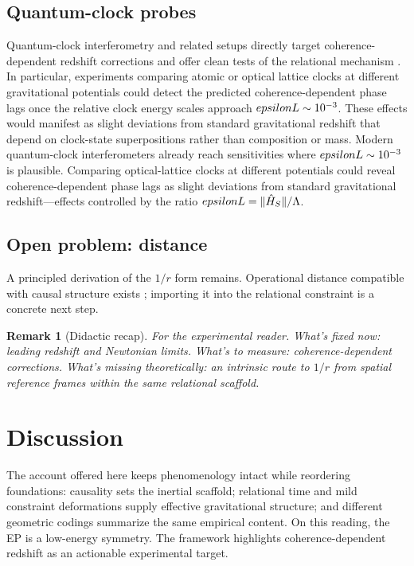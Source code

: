 \documentclass[11pt,a4paper]{article}
\theoremstyle{thmstyleone}
\theoremstyle{thmstyletwo}
\newtheorem{remark}{Remark}
\theoremstyle{thmstylethree}
\newcommand{\epsilonL}{\varepsilon_\Lambda} %
\begin{document}
    \subsection{Quantum-clock probes}\label{subsec:qclocks}
        Quantum-clock interferometry and related setups directly target coherence-dependent redshift corrections and offer clean tests of the relational mechanism \cite{SmithAhmadi2020,CastroRuiz2017}. In particular, experiments comparing atomic or optical lattice clocks at different gravitational potentials could detect the predicted coherence-dependent phase lags once the relative clock energy scales approach $\\epsilonL \sim 10^{-3}$. These effects would manifest as slight deviations from standard gravitational redshift that depend on clock-state superpositions rather than composition or mass. Modern quantum-clock interferometers already reach sensitivities where $\\epsilonL \sim 10^{-3}$ is plausible. Comparing optical-lattice clocks at different potentials could reveal coherence-dependent phase lags as slight deviations from standard gravitational redshift---effects controlled by the ratio $\\epsilonL = \lVert \hat{H}_S\rVert/\Lambda$.

    \subsection{Open problem: distance}\label{subsec:openproblem}
        A principled derivation of the $1/r$ form remains. Operational distance compatible with causal structure exists \cite{Pineda2026}; importing it into the relational constraint is a concrete next step.

        \begin{remark}[Didactic recap]
            \emph{For the experimental reader.} What’s fixed now: leading redshift and Newtonian limits. What’s to measure: coherence-dependent corrections. What’s missing theoretically: an intrinsic route to $1/r$ from spatial reference frames within the same relational scaffold.
        \end{remark}

    \section{Discussion}\label{sec:discussion}
    The account offered here keeps phenomenology intact while reordering foundations: causality sets the inertial scaffold; relational time and mild constraint deformations supply effective gravitational structure; and different geometric codings summarize the same empirical content. On this reading, the EP is a low-energy symmetry. The framework highlights coherence-dependent redshift as an actionable experimental target.
\end{document}
